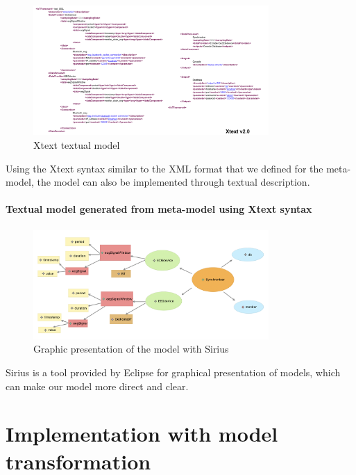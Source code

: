\documentclass{article}
\begin{document}
\begin{figure}[htbp] 
\centering 
\includegraphics[width=0.8\textwidth]{Xtex textual model.png} 
\caption{Xtext textual model} 
\label{Fig.main5} 
\end{figure}

Using the Xtext syntax similar to the XML format that we defined for the meta-model, the model can also be implemented through textual description.

\paragraph{Textual model generated from meta-model using Xtext syntax} 

\paragraph{}

\begin{figure}[htbp] 
\centering 
\includegraphics[width=0.8\textwidth]{Graphic presentation of the model with Sirius .png} 
\caption{Graphic presentation of the model with Sirius} 
\label{Fig.main5} 
\end{figure}

Sirius is a tool provided by Eclipse for graphical presentation of models, which can make our model more direct and clear.

\section{Implementation with model transformation}
\end{document}
